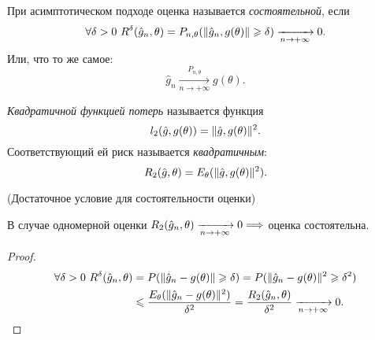 \begin{definition}
	При асимптотическом подходе оценка называется \textit{состоятельной},
	если 
	\[
		\forall \delta > 0~ R^\delta(\hat{g}_n, \theta) =
	P_{n, \theta}(\lVert\hat{g}_n, g(\theta)\rVert \geqslant \delta)
	\xrightarrow[n \to +\infty]{} 0
	.\]
	Или, что то же самое:
	\[
		\hat{g}_n \xrightarrow[n \to +\infty]{P_{n, \theta}} g(\theta)
	.\]
\end{definition}

\begin{definition}
	\textit{Квадратичной функцией потерь} называется функция
	\[
		l_2(\hat{g}, g(\theta)) = \lVert\hat{g}, g(\theta)\rVert^2
	.\]
	Соответствующий ей риск называется \textit{квадратичным}:
	\[
		R_2(\hat{g}, \theta) = E_\theta(\lVert\hat{g}, g(\theta)\rVert^2)
	.\]
\end{definition}

\begin{theorem}(Достаточное условие для состоятельности оценки)

	В случае одномерной оценки $R_2(\hat{g}_n, \theta) 
    \xrightarrow[n \to +\infty]{} 0 \Longrightarrow$ оценка состоятельна.
\end{theorem}
\begin{proof}
	\begin{align*}
		\forall \delta > 0~ R^\delta(\hat{g}_n, \theta)
		&= P(\lVert\hat{g}_n - g(\theta)\rVert \geqslant \delta) =
		P(\lVert\hat{g}_n - g(\theta)\rVert^2 \geqslant \delta^2)  \\
		&\leqslant \frac{E_\theta(\lVert\hat{g}_n - g(\theta)\rVert^2)}{\delta^2} =
		\frac{R_2(\hat{g}_n, \theta)}{\delta^2} \xrightarrow[n \to +\infty]{} 0
	.\end{align*} 
\end{proof}

